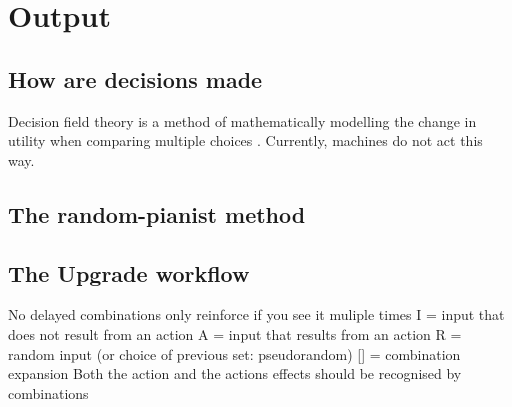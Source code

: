 \chapter{Output}
\section{How are decisions made}
Decision field theory is a method of mathematically modelling the change in utility when comparing multiple choices \cite{busemeyer2002survey}.
Currently, machines do not act this way.

\section{The random-pianist method}

\section{The Upgrade workflow}
No delayed combinations
only reinforce if you see it muliple times
I = input that does not result from an action
A = input that results from an action
R = random input (or choice of previous set: pseudorandom)
[] = combination expansion
Both the action and the actions effects should be recognised by combinations

